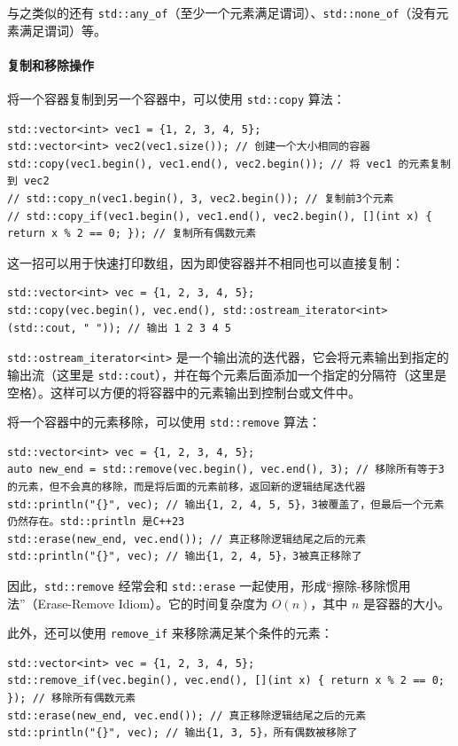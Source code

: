 与之类似的还有 \verb|std::any_of|（至少一个元素满足谓词）、\verb|std::none_of|（没有元素满足谓词）等。

\paragraph{复制和移除操作} 将一个容器复制到另一个容器中，可以使用 \verb|std::copy| 算法：
\begin{verbatim}
std::vector<int> vec1 = {1, 2, 3, 4, 5};
std::vector<int> vec2(vec1.size()); // 创建一个大小相同的容器
std::copy(vec1.begin(), vec1.end(), vec2.begin()); // 将 vec1 的元素复制到 vec2
// std::copy_n(vec1.begin(), 3, vec2.begin()); // 复制前3个元素
// std::copy_if(vec1.begin(), vec1.end(), vec2.begin(), [](int x) { return x % 2 == 0; }); // 复制所有偶数元素
\end{verbatim}
这一招可以用于快速打印数组，因为即使容器并不相同也可以直接复制：
\begin{verbatim}
std::vector<int> vec = {1, 2, 3, 4, 5};
std::copy(vec.begin(), vec.end(), std::ostream_iterator<int>(std::cout, " ")); // 输出 1 2 3 4 5
\end{verbatim}
\verb|std::ostream_iterator<int>| 是一个输出流的迭代器，它会将元素输出到指定的输出流（这里是 \verb|std::cout|），并在每个元素后面添加一个指定的分隔符（这里是空格）。这样可以方便的将容器中的元素输出到控制台或文件中。

将一个容器中的元素移除，可以使用 \verb|std::remove| 算法：
\begin{verbatim}
std::vector<int> vec = {1, 2, 3, 4, 5};
auto new_end = std::remove(vec.begin(), vec.end(), 3); // 移除所有等于3的元素，但不会真的移除，而是将后面的元素前移，返回新的逻辑结尾迭代器
std::println("{}", vec); // 输出{1, 2, 4, 5, 5}，3被覆盖了，但最后一个元素仍然存在。std::println 是C++23
std::erase(new_end, vec.end()); // 真正移除逻辑结尾之后的元素
std::println("{}", vec); // 输出{1, 2, 4, 5}，3被真正移除了
\end{verbatim}
因此，\verb|std::remove| 经常会和 \verb|std::erase| 一起使用，形成“擦除-移除惯用法”（Erase-Remove Idiom）。它的时间复杂度为 $O(n)$，其中 $n$ 是容器的大小。

此外，还可以使用 \verb|remove_if| 来移除满足某个条件的元素：
\begin{verbatim}
std::vector<int> vec = {1, 2, 3, 4, 5};
std::remove_if(vec.begin(), vec.end(), [](int x) { return x % 2 == 0; }); // 移除所有偶数元素
std::erase(new_end, vec.end()); // 真正移除逻辑结尾之后的元素
std::println("{}", vec); // 输出{1, 3, 5}，所有偶数被移除了
\end{verbatim}

